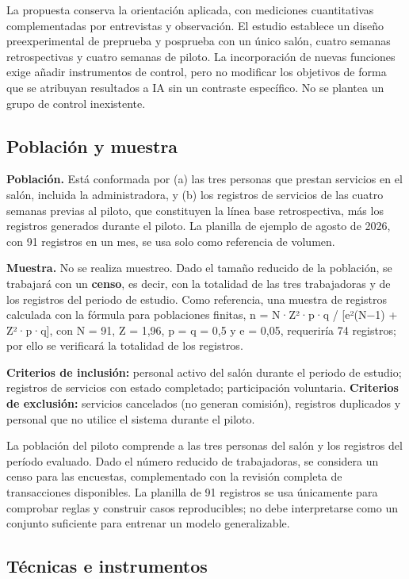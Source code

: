 La propuesta conserva la orientación aplicada, con mediciones cuantitativas complementadas por entrevistas y observación. El estudio establece un diseño preexperimental de preprueba y posprueba con un único salón, cuatro semanas retrospectivas y cuatro semanas de piloto. La incorporación de nuevas funciones exige añadir instrumentos de control, pero no modificar los objetivos de forma que se atribuyan resultados a IA sin un contraste específico. No se plantea un grupo de control inexistente.


\subsection{Población y muestra}

\textbf{Población.} Está conformada por (a) las tres personas que prestan servicios en el salón, incluida la administradora, y (b) los registros de servicios de las cuatro semanas previas al piloto, que constituyen la línea base retrospectiva, más los registros generados durante el piloto. La planilla de ejemplo de agosto de 2026, con 91 registros en un mes, se usa solo como referencia de volumen.


\textbf{Muestra.} No se realiza muestreo. Dado el tamaño reducido de la población, se trabajará con un \textbf{censo}, es decir, con la totalidad de las tres trabajadoras y de los registros del periodo de estudio. Como referencia, una muestra de registros calculada con la fórmula para poblaciones finitas, n = N·Z²·p·q / [e²(N−1) + Z²·p·q], con N = 91, Z = 1,96, p = q = 0,5 y e = 0,05, requeriría 74 registros; por ello se verificará la totalidad de los registros.


\textbf{Criterios de inclusión:} personal activo del salón durante el periodo de estudio; registros de servicios con estado completado; participación voluntaria. \textbf{Criterios de exclusión:} servicios cancelados (no generan comisión), registros duplicados y personal que no utilice el sistema durante el piloto.


La población del piloto comprende a las tres personas del salón y los registros del período evaluado. Dado el número reducido de trabajadoras, se considera un censo para las encuestas, complementado con la revisión completa de transacciones disponibles. La planilla de 91 registros se usa únicamente para comprobar reglas y construir casos reproducibles; no debe interpretarse como un conjunto suficiente para entrenar un modelo generalizable.


\subsection{Técnicas e instrumentos}

